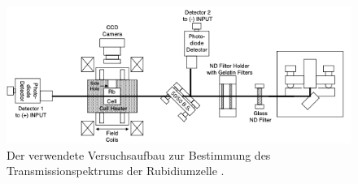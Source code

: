 \begin{figure}
    \centering
    \includegraphics[width=\textwidth]{content/pics/Aufbau.png}
    \caption{Der verwendete Versuchsaufbau zur Bestimmung des Transmissionspektrums der Rubidiumzelle \cite{diode_laser_spectroscopy}.}
    \label{fig:Aufbau}
\end{figure}
